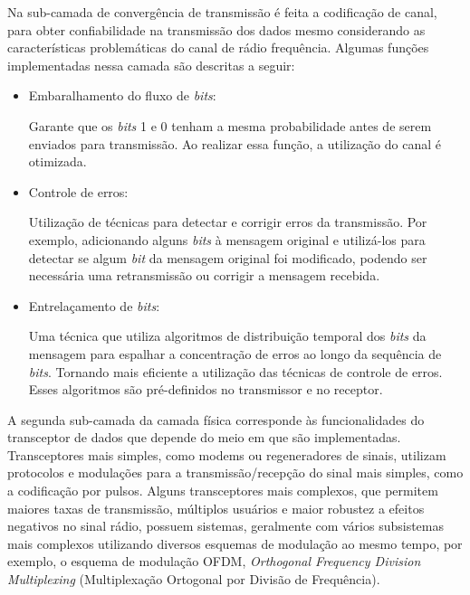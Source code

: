 Na sub-camada de convergência de transmissão é feita a codificação de canal, para obter confiabilidade na transmissão dos dados mesmo considerando as características problemáticas do canal de rádio frequência. Algumas funções implementadas nessa camada são descritas a seguir:
\begin{itemize}
      \item Embaralhamento do fluxo de \emph{bits}:

            Garante que os \emph{bits} 1 e 0 tenham a mesma probabilidade antes de serem enviados para transmissão. Ao realizar essa função, a utilização do canal é otimizada.
      \item Controle de erros:

            Utilização de técnicas para detectar e corrigir erros da transmissão. Por exemplo, adicionando alguns \emph{bits} à mensagem original e utilizá-los para detectar se algum \emph{bit} da mensagem original foi modificado, podendo ser necessária uma retransmissão ou corrigir a mensagem recebida.
      \item Entrelaçamento de \emph{bits}:

            Uma técnica que utiliza algoritmos de distribuição temporal dos \emph{bits} da mensagem para espalhar a concentração de erros ao longo da sequência de \emph{bits}. Tornando mais eficiente a utilização das técnicas de controle de erros. Esses algoritmos são pré-definidos no transmissor e no receptor.
\end{itemize}

A segunda sub-camada da camada física corresponde às funcionalidades do transceptor de dados que depende do meio em que são implementadas. Transceptores mais simples, como modems ou regeneradores de sinais, utilizam protocolos e modulações para a transmissão/recepção do sinal mais simples, como a codificação por pulsos. Alguns transceptores mais complexos, que permitem maiores taxas de transmissão, múltiplos usuários e maior robustez a efeitos negativos no sinal rádio, possuem sistemas, geralmente com vários subsistemas mais complexos utilizando diversos esquemas de modulação ao mesmo tempo, por exemplo, o esquema de modulação OFDM, \emph{Orthogonal Frequency Division Multiplexing} (Multiplexação Ortogonal por Divisão de Frequência).


